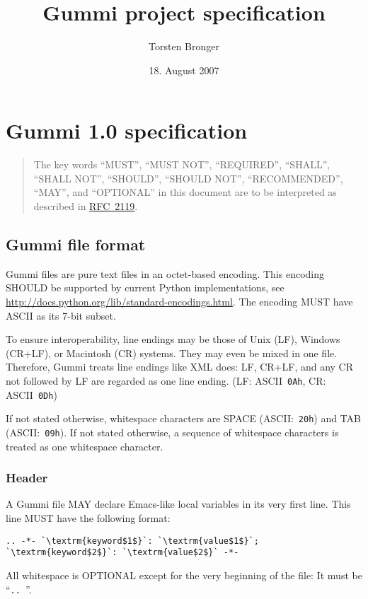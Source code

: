 \documentclass[12pt,openany]{book}
\begin{document}
\title{Gummi project specification}
\author{Torsten Bronger}
\date{18. August 2007}
\maketitle

\tableofcontents

\chapter{Gummi 1.0 specification}

\begin{quotation}
  The key words ``MUST'', ``MUST NOT'', ``REQUIRED'', ``SHALL'', ``SHALL NOT'',
  ``SHOULD'', ``SHOULD NOT'', ``RECOMMENDED'', ``MAY'', and ``OPTIONAL'' in
  this document are to be interpreted as described in
  \href{http://tools.ietf.org/html/rfc2119}{RFC~2119}.
\end{quotation}
      
\section{Gummi file format}

Gummi files are pure text files in an octet-based encoding.  This encoding
SHOULD be supported by current Python implementations, see
\url{http://docs.python.org/lib/standard-encodings.html}.  The encoding MUST
have ASCII as its \mbox{7-bit} subset.

To ensure interoperability, line endings may be those of Unix (LF), Windows
(CR+LF), or Macintosh (CR) systems.  They may even be mixed in one file.
Therefore, Gummi treats line endings like XML does: LF, CR+LF, and any CR not
followed by LF are regarded as one line ending.  (LF: ASCII~\verb|0Ah|, CR:
ASCII~\verb|0Dh|)

If not stated otherwise, whitespace characters are SPACE (ASCII:~\verb|20h|)
and TAB (ASCII:~\verb|09h|).  If not stated otherwise, a sequence of whitespace
characters is treated as one whitespace character.

\subsection{Header}

A Gummi file MAY declare Emacs-like local variables in its very first line.
This line MUST have the following format:
\begin{lstlisting}[escapechar=`]
.. -*- `\textrm{keyword$1$}`: `\textrm{value$1$}`; `\textrm{keyword$2$}`: `\textrm{value$2$}` -*-
\end{lstlisting}
All whitespace is OPTIONAL except for the very beginning of the file: It must
be ``\verb*|.. |''.
\end{document}
